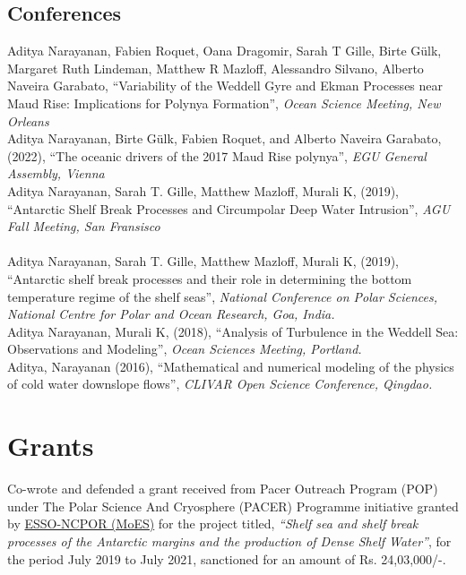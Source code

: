 \documentclass[12pt, a4paper]{article}
\newcommand{\years}[1]{\marginnote{\small #1}}
\begin{document}
\subsection*{\bf Conferences}
\years{2023} Aditya Narayanan, Fabien Roquet, Oana Dragomir, Sarah T Gille, Birte Gülk, Margaret Ruth Lindeman, Matthew R Mazloff, Alessandro Silvano, Alberto Naveira Garabato, ``Variability of the Weddell Gyre and Ekman Processes near Maud Rise: Implications for Polynya Formation'', \emph{Ocean Science Meeting, New Orleans}\\
\years{2022}Aditya Narayanan, Birte G\"ulk, Fabien Roquet, and Alberto Naveira Garabato, (2022), ``The oceanic drivers of the 2017 Maud Rise polynya'', \emph{EGU General Assembly, Vienna}\\
\years{2019}Aditya Narayanan, Sarah T. Gille, Matthew Mazloff, Murali K, (2019), ``Antarctic Shelf Break Processes and Circumpolar Deep Water Intrusion'', \emph{AGU Fall Meeting, San Fransisco}\\
\\
\years{2019}Aditya Narayanan, Sarah T. Gille, Matthew Mazloff, Murali K, (2019), ``Antarctic shelf break processes and their role in determining the bottom temperature regime of the shelf seas'', \emph{National Conference on Polar Sciences, National Centre for Polar and Ocean Research, Goa, India.}\\

\years{2018}Aditya Narayanan, Murali K, (2018), ``Analysis of Turbulence in the Weddell Sea: Observations and Modeling'', \emph{Ocean Sciences Meeting, Portland.}\\

\years{2016}Aditya, Narayanan (2016), ``Mathematical and numerical modeling of the physics of cold water downslope flows'', \emph{CLIVAR Open Science Conference, Qingdao.}





\section*{Grants}
\years{2019--2021} Co-wrote and defended a grant received from Pacer Outreach Program (POP) under The Polar Science And Cryosphere (PACER) Programme initiative granted by \href{http://ncaor.gov.in/}{ESSO-NCPOR (MoES)} for the project titled, \emph{``Shelf sea and shelf break processes of the Antarctic margins and the production of Dense Shelf Water''}, for the period July 2019 to July 2021, sanctioned for an amount of Rs. 24,03,000/-.\\
\end{document}
